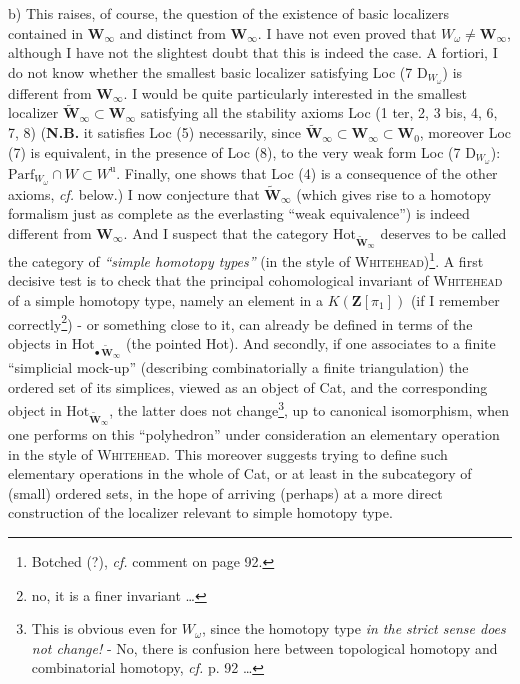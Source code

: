 b) This raises, of course, the question of the existence of basic localizers contained in $\mathbf{W}_\infty$ and
distinct from $\mathbf{W}_\infty$. I have not even proved that $W_\omega \neq \mathbf{W}_\infty$, although I have not the slightest doubt that this is indeed the case. A fortiori, I do not know whether the smallest basic localizer satisfying Loc (7 D$_{W_\omega}$) is different from $\mathbf{W}_\infty$. I would be quite particularly interested in the smallest localizer $\tilde{\mathbf{W}}_\infty \subset \mathbf{W}_\infty$ satisfying all the stability axioms Loc (1 ter, 2, 3 bis, 4, 6, 7, 8) (\textbf{N.B.} it satisfies
Loc (5) necessarily, since $\tilde{\mathbf{W}}_\infty \subset \mathbf{W}_\infty \subset \mathbf{W}_0$, moreover Loc (7) is equivalent, in the presence of Loc (8), to the very weak form Loc (7 D$_{W_\omega}$): $\mathrm{Parf}_{W_\omega} \cap W \subset W^{\mathrm{u}}$. Finally, one shows that Loc (4) is a consequence of the other axioms, \textit{cf.} below.) I now conjecture that $\tilde{\mathbf{W}}_\infty$ (which gives rise to a homotopy formalism just as complete as the everlasting ``weak equivalence'') is indeed different from $\mathbf{W}_\infty$. And I suspect
that the category $\mathrm{Hot}_{\tilde{\mathbf{W}}_\infty}$ deserves to be called the category of \textit{``simple homotopy types''} (in the style of \textsc{Whitehead})\footnote[41]{Botched (?), \textit{cf.} comment on page 92.}. A first decisive test is to check that the principal cohomological invariant of \textsc{Whitehead} of a simple homotopy type, namely an element in a $K(\mathbf{Z}[\pi_1])$ (if I remember correctly\footnote[42]{no, it is a finer invariant \ldots}) - or something close to it, can already be defined in terms of the objects in $\mathrm{Hot}_{\bullet\,\tilde{\mathbf{W}}_\infty}$ (the pointed Hot). And secondly, if one associates to a finite ``simplicial mock-up'' (describing combinatorially a finite triangulation) the ordered set of its simplices, viewed as an object of Cat, and the corresponding object in $\mathrm{Hot}_{\tilde{\mathbf{W}}_\infty}$, the latter does not change\footnote[43]{This is obvious even for $W_\omega$, since the homotopy type \textit{in the strict sense does not change!} - No, there is confusion here between topological homotopy and combinatorial homotopy, \textit{cf.} p. 92 \ldots}, up to canonical isomorphism, when one performs on this ``polyhedron'' under consideration an elementary operation in the style of \textsc{Whitehead}. This moreover suggests trying to define such elementary operations in the whole of Cat, or at least in the subcategory of (small) ordered sets, in the hope of arriving (perhaps) at a more direct construction of the localizer relevant to simple homotopy type.

